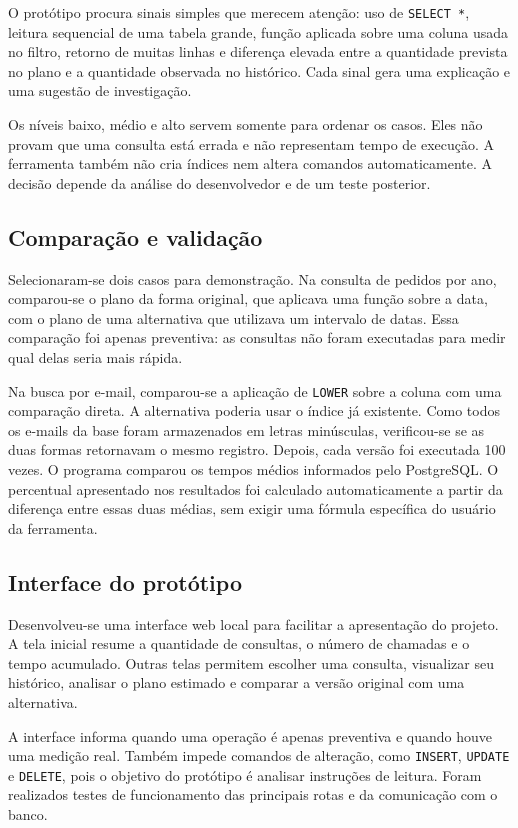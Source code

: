 O protótipo procura sinais simples que merecem atenção: uso de \texttt{SELECT *}, leitura sequencial de uma tabela grande, função aplicada sobre uma coluna usada no filtro, retorno de muitas linhas e diferença elevada entre a quantidade prevista no plano e a quantidade observada no histórico. Cada sinal gera uma explicação e uma sugestão de investigação.

Os níveis baixo, médio e alto servem somente para ordenar os casos. Eles não provam que uma consulta está errada e não representam tempo de execução. A ferramenta também não cria índices nem altera comandos automaticamente. A decisão depende da análise do desenvolvedor e de um teste posterior.

\subsection{Comparação e validação}

Selecionaram-se dois casos para demonstração. Na consulta de pedidos por ano, comparou-se o plano da forma original, que aplicava uma função sobre a data, com o plano de uma alternativa que utilizava um intervalo de datas. Essa comparação foi apenas preventiva: as consultas não foram executadas para medir qual delas seria mais rápida.

Na busca por e-mail, comparou-se a aplicação de \texttt{LOWER} sobre a coluna com uma comparação direta. A alternativa poderia usar o índice já existente. Como todos os e-mails da base foram armazenados em letras minúsculas, verificou-se se as duas formas retornavam o mesmo registro. Depois, cada versão foi executada 100 vezes. O programa comparou os tempos médios informados pelo PostgreSQL. O percentual apresentado nos resultados foi calculado automaticamente a partir da diferença entre essas duas médias, sem exigir uma fórmula específica do usuário da ferramenta.

\subsection{Interface do protótipo}

Desenvolveu-se uma interface web local para facilitar a apresentação do projeto. A tela inicial resume a quantidade de consultas, o número de chamadas e o tempo acumulado. Outras telas permitem escolher uma consulta, visualizar seu histórico, analisar o plano estimado e comparar a versão original com uma alternativa.

A interface informa quando uma operação é apenas preventiva e quando houve uma medição real. Também impede comandos de alteração, como \texttt{INSERT}, \texttt{UPDATE} e \texttt{DELETE}, pois o objetivo do protótipo é analisar instruções de leitura. Foram realizados testes de funcionamento das principais rotas e da comunicação com o banco.

